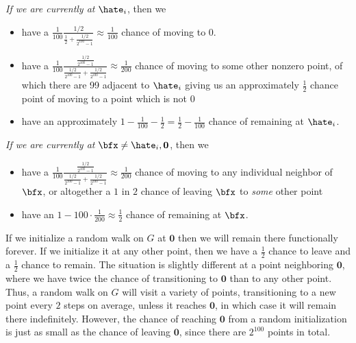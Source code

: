 \begin{homework}[e]
\begin{prf}
    \noindent\emph{If we are currently at }$\hate_i$, then we
    \begin{itemize}
      \item have a $\frac{1}{100}\frac{1/2}{\frac{1}{2}+\frac{1/2}{2^{100}-1}}\approx \frac{1}{100}$ chance of moving to 0.
      \item have a $\frac{1}{100}\frac{\frac{1/2}{2^{100}-1}}{\frac{1/2}{2^{100}-1} + \frac{1/2}{2^{100}-1}}\approx \frac{1}{200}$ chance of moving to some other nonzero point, of which there are 99 adjacent to $\hate_i$ giving us an approximately $\frac{1}{2}$ chance point of moving to a point which is not $0$
      \item have an approximately $1 - \frac{1}{100} - \frac{1}{2} = \frac{1}{2}-\frac{1}{100}$ chance of remaining at $\hate_i$.
    \end{itemize}

    \bigskip

    \emph{If we are currently at } $\bfx\neq \hate_i, \mathbf{0}$, then we
    \begin{itemize}
      \item have a $\frac{1}{100}\frac{\frac{1/2}{2^{100}-1}}{\frac{1/2}{2^{100}-1}+\frac{1/2}{2^{100}-1}} \approx \frac{1}{200}$ chance of moving to any individual neighbor of $\bfx$, or altogether a $1$ in $2$ chance of leaving $\bfx$ to \emph{some} other point
      \item have an $1 - 100\cdot \frac{1}{200} \approx \frac{1}{2}$ chance of remaining at $\bfx$.
    \end{itemize}

    If we initialize a random walk on $G$ at $\mathbf{0}$ then we will remain there functionally forever. If we initialize it at any other point, then we have a $\frac{1}{2}$ chance to leave and a $\frac{1}{2}$ chance to remain. The situation is slightly different at a point neighboring $\mathbf{0}$, where we have twice the chance of transitioning to $\mathbf{0}$ than to any other point. Thus, a random walk on $G$ will visit a variety of points, transitioning to a new point every $2$ steps on average, unless it reaches $\mathbf{0}$, in which case it will remain there indefinitely. However, the chance of reaching $\mathbf{0}$ from a random initialization is just as small as the chance of leaving $\mathbf{0}$, since there are $2^{100}$ points in total.
  \end{prf}
\end{homework}
\newpage
\begin{verbatim}  
\end{verbatim}

